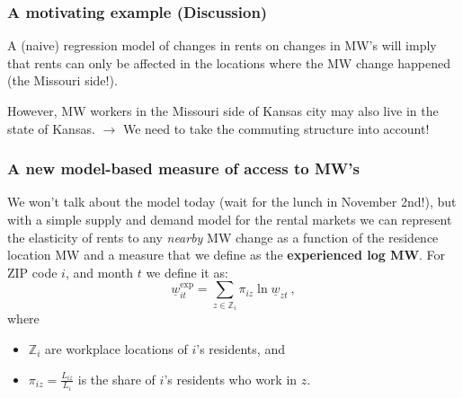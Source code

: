 \documentclass[aspectratio=169]{beamer}
\begin{document}
\begin{frame}
    \frametitle{A motivating example (Discussion)}
    A (naive) regression model of changes in rents on changes in MW's will imply that rents can only be affected 
    in the locations where the MW change happened (the Missouri side!). 
    
    \pause
    \vspace{3mm}
    
    However, MW workers in the Missouri side of Kansas city may also live in the state of Kansas. $\to$ 
    We need to take the commuting structure into account! 
\end{frame}

\begin{frame}
    \frametitle{A new model-based measure of access to MW's}

    We won't talk about the model today (wait for the lunch in November 2nd!), but with a simple supply and demand model for the rental markets
    we can represent the elasticity of rents to any \textit{nearby} MW change as a function of the residence location
    MW and a measure that we define as the \textbf{experienced log MW}. For ZIP code $i$, and month $t$ we define it as:
	$$
	\underline{w}^{\text{exp}}_{it} = 
	\sum_{z \in \mathbb{Z}_i} \pi_{i z} \ln \underline{w}_{zt} \ ,
	$$
	\vspace{-2.5mm}
	where
	\vspace{1mm}
	\begin{itemize} \small
		\item $\mathbb{Z}_i$ are workplace locations of $i$'s residents, and
		\item $\pi_{i z} = \frac{L_{i z}}{L_i}$ is the share of $i$'s residents who work 
		in $z$.
	\end{itemize}
\end{frame}
\end{document}
